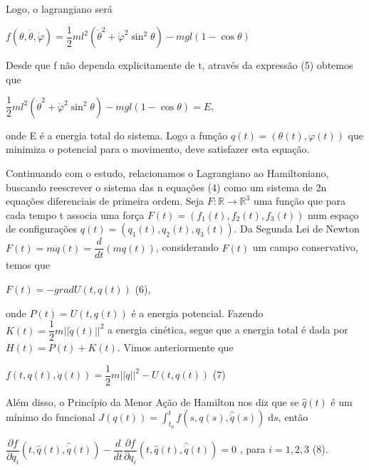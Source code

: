 \documentclass[12pt, a4paper]{article}
\begin{document}
Logo, o lagrangiano será

\begin{center}
$ f(\theta, \dot \theta, \dot \varphi) =  \dfrac{1}{2}ml^2({\dot \theta}^2 + {\dot \varphi}^2 \sin^2 \theta) - mgl(1-\cos\theta)$
\end{center}

Desde que f não dependa explicitamente de t, através da expressão (5) obtemos que

\begin{center}
$\dfrac{1}{2}ml^2({\dot \theta}^2 + {\dot \varphi}^2 \sin^2 \theta) - mgl(1-\cos\theta) = E$,
\end{center}

onde E é a energia total do sistema. Logo a função $q(t)=(\theta(t),\varphi(t))$ que minimiza o potencial para o movimento, deve satisfazer esta equação.

Continuando com o estudo, relacionamos o Lagrangiano ao Hamiltoniano, buscando reescrever o sistema das n equações (4) como um sistema de 2n equações diferenciais de primeira ordem.
Seja $F: \mathbb{R} \to \mathbb{R}^3$ uma função que para cada tempo t associa uma força $F(t)=(f_1(t),f_2(t),f_3(t))$ num espaço de configurações $q(t)=(q_1(t),q_2(t),q_3(t))$. Da Segunda Lei de Newton $F(t)=m\ddot q(t)=  \dfrac{d}{dt}(mq(t))$, considerando $F(t)$ um campo conservativo, temos que

\begin{center}
$ F(t) = -grad U(t, q(t)) $ (6),
\end{center}

onde $P(t) = U(t,q(t))$ é a energia potencial. Fazendo $K(t)= \dfrac{1}{2} m||\dot{q}(t)||^2$ a energia cinética, segue que a energia total é dada por $H(t)=P(t)+K(t)$.
Vimos anteriormente que 

\begin{center}
$ f(t, q(t), \dot{q}(t)) = \dfrac{1}{2} m||\dot{q}||^2 -U(t, q(t)) $ (7)
\end{center}

Além disso, o Princípio da Menor Ação de Hamilton nos diz que se $\hat{q}(t)$ é um mínimo do funcional $J(q(t))= \int_{t_0}^t f(s,q(s),\hat{\dot{q}}(s)) \; \mathrm{d}s$, então 

\begin{center}
$ \dfrac{\partial f}{\partial q_i}(t, \hat{q}(t), \hat{\dot{q}}(t)) - \dfrac{d}{dt} \dfrac{\partial f}{\partial q_i}(t, \hat{q}(t), \hat{\dot{q}}(t)) = 0$ , para $i = 1,2,3$ (8).
\end{center}
\end{document}
